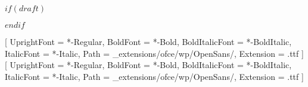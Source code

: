 \usepackage{titlepic}
\usepackage{titling}
\usepackage{graphicx}
\usepackage{fontspec}
\usepackage{placeins}
\usepackage{graphbox}
\usepackage{tikz}
\usepackage{geometry}
\usepackage{xcolor}
\usepackage{amsmath}
\usepackage[some]{background}
$if(draft)$
\usepackage[stamp,color=red!10]{draftwatermark}
$endif$
\usepackage{lipsum}
\usepackage{caption}
\usepackage{datetime}
\usepackage{xstring}
\usepackage{blindtext}
\usepackage{scrlayer-scrpage}

\setmainfont{OpenSans}[
  UprightFont = {*-Regular},
  BoldFont = {*-Bold},
  BoldItalicFont = {*-BoldItalic},
  ItalicFont = {*-Italic},
  Path = {_extensions/ofce/wp/OpenSans/},
  Extension = {.ttf}
]
\setsansfont{OpenSans}[
  UprightFont = {*-Regular},
  BoldFont = {*-Bold},
  BoldItalicFont = {*-BoldItalic},
  ItalicFont = {*-Italic},
  Path = {_extensions/ofce/wp/OpenSans/},
  Extension = {.ttf}
]

\def\getYear#1{\StrLeft{#1}{4}}
\def\getMonth#1{\StrMid{#1}{6}{7}}
\def\getDay#1{\StrRight{#1}{2}}

\def\jolimois#1{\monthname{\getMonth{#1}}}


\clearpairofpagestyles


\pagestyle{scrheadings}


\lofoot*{\thepage}
